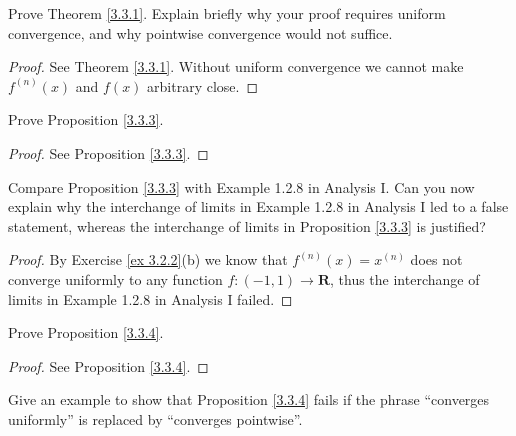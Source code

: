 \exercisesection

\begin{exercise}\label{ex 3.3.1}
    Prove Theorem \ref{3.3.1}.
    Explain briefly why your proof requires uniform convergence, and why pointwise convergence would not suffice.
\end{exercise}

\begin{proof}
    See Theorem \ref{3.3.1}.
    Without uniform convergence we cannot make \(f^{(n)}(x)\) and \(f(x)\) arbitrary close.
\end{proof}

\begin{exercise}\label{ex 3.3.2}
    Prove Proposition \ref{3.3.3}.
\end{exercise}

\begin{proof}
    See Proposition \ref{3.3.3}.
\end{proof}

\begin{exercise}\label{ex 3.3.3}
    Compare Proposition \ref{3.3.3} with Example 1.2.8 in Analysis I.
    Can you now explain why the interchange of limits in Example 1.2.8 in Analysis I led to a false statement, whereas the interchange of limits in Proposition \ref{3.3.3} is justified?
\end{exercise}

\begin{proof}
    By Exercise \ref{ex 3.2.2}(b) we know that \(f^{(n)}(x) = x^{(n)}\) does not converge uniformly to any function \(f : (-1, 1) \to \mathbf{R}\), thus the interchange of limits in Example 1.2.8 in Analysis I failed.
\end{proof}

\begin{exercise}\label{ex 3.3.4}
    Prove Proposition \ref{3.3.4}.
\end{exercise}

\begin{proof}
    See Proposition \ref{3.3.4}.
\end{proof}

\begin{exercise}\label{ex 3.3.5}
    Give an example to show that Proposition \ref{3.3.4} fails if the phrase ``converges uniformly'' is replaced by ``converges pointwise''.
\end{exercise}

